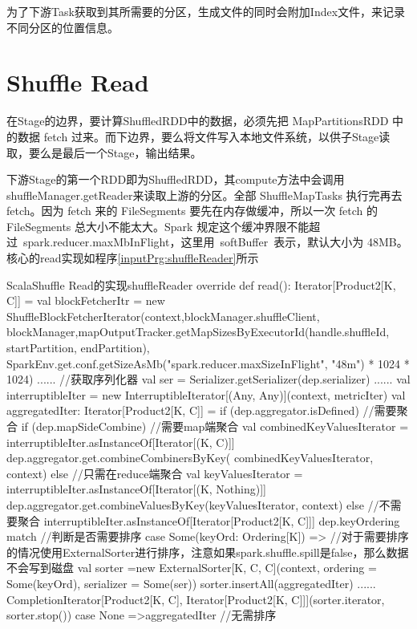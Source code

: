 为了下游Task获取到其所需要的分区，生成文件的同时会附加Index文件，来记录不同分区的位置信息。
\section{Shuffle Read}

在Stage的边界，要计算ShuffledRDD中的数据，必须先把 MapPartitionsRDD 中的数据 fetch 过来。而下边界，要么将文件写入本地文件系统，以供子Stage读取，要么是最后一个Stage，输出结果。

下游Stage的第一个RDD即为ShuffledRDD，其compute方法中会调用shuffleManager.getReader来读取上游的分区。全部 ShuffleMapTasks 执行完再去 fetch。因为 fetch 来的 FileSegments 要先在内存做缓冲，所以一次 fetch 的 FileSegments 总大小不能太大。Spark 规定这个缓冲界限不能超过 spark.reducer.maxMbInFlight，这里用 softBuffer 表示，默认大小为 48MB。核心的read实现如程序\ref{inputPrg:shuffleReader}所示
\begin{codeInput}{Scala}{Shuffle Read的实现}{shuffleReader}
override def read(): Iterator[Product2[K, C]] = {
val blockFetcherItr = new ShuffleBlockFetcherIterator(context,blockManager.shuffleClient,
blockManager,mapOutputTracker.getMapSizesByExecutorId(handle.shuffleId, startPartition, endPartition),
  SparkEnv.get.conf.getSizeAsMb("spark.reducer.maxSizeInFlight", "48m") * 1024 * 1024)
  ......
  //获取序列化器
  val ser = Serializer.getSerializer(dep.serializer)
  ......
  val interruptibleIter = new InterruptibleIterator[(Any, Any)](context, metricIter)	
  val aggregatedIter: Iterator[Product2[K, C]] = if (dep.aggregator.isDefined) {//需要聚合
    if (dep.mapSideCombine) {//需要map端聚合
      val combinedKeyValuesIterator = interruptibleIter.asInstanceOf[Iterator[(K, C)]]
      dep.aggregator.get.combineCombinersByKey(
      combinedKeyValuesIterator, context)
    } else {//只需在reduce端聚合
      val keyValuesIterator = interruptibleIter.asInstanceOf[Iterator[(K, Nothing)]]
      dep.aggregator.get.combineValuesByKey(keyValuesIterator, context)
    }
  } else {//不需要聚合
    interruptibleIter.asInstanceOf[Iterator[Product2[K, C]]]
  }
  dep.keyOrdering match {//判断是否需要排序
    case Some(keyOrd: Ordering[K]) =>
    //对于需要排序的情况使用ExternalSorter进行排序，注意如果spark.shuffle.spill是false，那么数据不会写到磁盘
      val sorter =new ExternalSorter[K, C, C](context, ordering = Some(keyOrd), serializer = Some(ser))
      sorter.insertAll(aggregatedIter)
      ......
      CompletionIterator[Product2[K, C], Iterator[Product2[K, C]]](sorter.iterator, sorter.stop())
    case None =>aggregatedIter
    //无需排序
  }
}
\end{codeInput}

